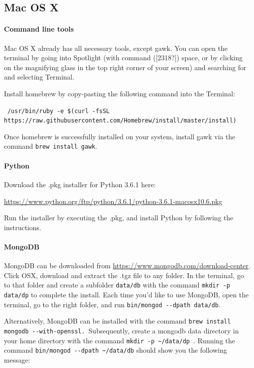 \documentclass[a4paper]{report}
\begin{document}
\subsection*{Mac OS X}

\paragraph{Command line tools}
Mac OS X already has all necessary tools, except gawk. You can open the
terminal by going into Spotlight (with command ([2318?]) space, or by
clicking on the magnifying glass in the top right corner of your
screen) and searching for and selecting Terminal. 

Install homebrew by copy-pasting the following command into the
Terminal:

\noindent\small\texttt{
/usr/bin/ruby -e \$(curl -fsSL https://raw.githubusercontent.com/Homebrew/install/master/install)}


Once homebrew is successfully installed on your system, install gawk via
the command \small\texttt{brew install gawk}.

\paragraph{Python}
Download the .pkg installer for Python 3.6.1 here:

\url{https://www.python.org/ftp/python/3.6.1/python-3.6.1-macosx10.6.pkg}

Run the installer by executing the .pkg, and install Python by following
the instructions.

\paragraph{MongoDB}
MongoDB can be downloaded from
\url{https://www.mongodb.com/download-center}. Click OSX, download and
extract the .tgz file to any folder. In the terminal, go to that folder
and create a subfolder \small\texttt{data/db} with the command \small\texttt{mkdir
-p data/dp} to complete the install. Each time you{\textquoteright}d
like to use MongoDB, open the terminal, go to the right folder, and run
\small\texttt{bin/mongod -{}-dpath data/db}.

Alternatively, MongoDB can be installed with the command \small\texttt{brew
install mongodb -{}-with-openssl. }Subsequently, create a mongodb data
directory in your home directory with the command \small\texttt{mkdir -p
\~{}/data/dp }. Running the command \small\texttt{bin/mongod -{}-dpath
\~{}/data/db} should show you the following message:
\end{document}
